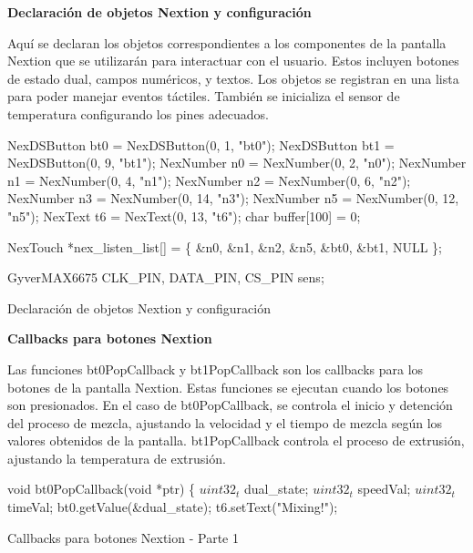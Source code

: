 \documentclass[14pt,oneside]{extarticle} %
\begin{document}
\textbf{Declaración de objetos Nextion y configuración}

Aquí se declaran los objetos correspondientes a los componentes de la pantalla Nextion que se utilizarán para interactuar con el usuario. Estos incluyen botones de estado dual, campos numéricos, y textos. Los objetos se registran en una lista para poder manejar eventos táctiles. También se inicializa el sensor de temperatura configurando los pines adecuados.

\begin{algorithm}[H]
\SetAlgoLined

NexDSButton bt0 = NexDSButton(0, 1, "bt0"); \;
NexDSButton bt1 = NexDSButton(0, 9, "bt1"); \;
NexNumber n0 = NexNumber(0, 2, "n0"); \;
NexNumber n1 = NexNumber(0, 4, "n1"); \;
NexNumber n2 = NexNumber(0, 6, "n2"); \;
NexNumber n3 = NexNumber(0, 14, "n3"); \;
NexNumber n5 = NexNumber(0, 12, "n5"); \;
NexText t6 = NexText(0, 13, "t6"); \;
char buffer[100] = {0}; \;


NexTouch *nex\_listen\_list[] = \{
    &n0, \;
    &n1, \;
    &n2, \;
    &n5, \;
    &bt0, \;
    &bt1, \;
    NULL \;
\};

GyverMAX6675 CLK\_PIN, DATA\_PIN, CS\_PIN sens; \;

\caption{Declaración de objetos Nextion y configuración}
\label{al:DeclaracionObjetosNextion}
\end{algorithm}

\textbf{Callbacks para botones Nextion}

Las funciones bt0PopCallback y bt1PopCallback son los callbacks para los botones de la pantalla Nextion. Estas funciones se ejecutan cuando los botones son presionados. En el caso de bt0PopCallback, se controla el inicio y detención del proceso de mezcla, ajustando la velocidad y el tiempo de mezcla según los valores obtenidos de la pantalla. bt1PopCallback controla el proceso de extrusión, ajustando la temperatura de extrusión.

\begin{algorithm}[H]
\SetAlgoLined

void bt0PopCallback(void *ptr) \{
    $uint32_t$ dual\_state; \;
    $uint32_t$ speedVal; \;
    $uint32_t$ timeVal; \;
    bt0.getValue(&dual\_state); \;
    t6.setText("Mixing!"); \;

\caption{Callbacks para botones Nextion - Parte 1}
\label{al:CallbacksBotonesNextion}
\end{algorithm}
\end{document}

